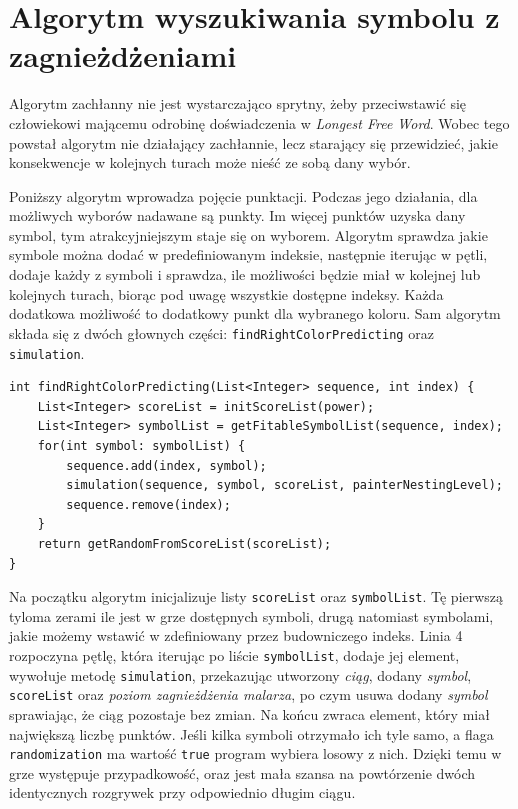 \documentclass[document]{xmgr}
\begin{document}
\section{Algorytm wyszukiwania symbolu z zagnieżdżeniami}
Algorytm zachłanny nie jest wystarczająco sprytny, żeby przeciwstawić się człowiekowi mającemu odrobinę doświadczenia w \emph{Longest Free Word}. Wobec tego powstał algorytm nie działający zachłannie, lecz starający się przewidzieć, jakie konsekwencje w kolejnych turach może nieść ze sobą dany wybór.

Poniższy algorytm wprowadza pojęcie punktacji. Podczas jego działania, dla możliwych wyborów nadawane są punkty. Im więcej punktów uzyska dany symbol, tym atrakcyjniejszym staje się on wyborem. Algorytm sprawdza jakie symbole można dodać w predefiniowanym indeksie, następnie iterując w pętli, dodaje każdy z symboli i sprawdza, ile możliwości będzie miał w kolejnej lub kolejnych turach, biorąc pod uwagę wszystkie dostępne indeksy. Każda dodatkowa możliwość to dodatkowy punkt dla wybranego koloru. Sam algorytm składa się z dwóch głownych części: \mbox{\texttt{findRightColorPredicting}} oraz \texttt{simulation}.

\begin{lstlisting}[frame=single]
int findRightColorPredicting(List<Integer> sequence, int index) {
	List<Integer> scoreList = initScoreList(power);
	List<Integer> symbolList = getFitableSymbolList(sequence, index);
	for(int symbol: symbolList) {
		sequence.add(index, symbol);
		simulation(sequence, symbol, scoreList, painterNestingLevel);
		sequence.remove(index);
	}
	return getRandomFromScoreList(scoreList);
}
\end{lstlisting}
 
Na początku algorytm inicjalizuje listy \texttt{scoreList} oraz \texttt{symbolList}. Tę pierwszą tyloma zerami ile jest w grze dostępnych symboli, drugą natomiast symbolami, jakie możemy wstawić w zdefiniowany przez budowniczego indeks. Linia 4 rozpoczyna pętlę, która iterując po liście \texttt{symbolList}, dodaje jej element, wywołuje metodę \texttt{simulation}, przekazując utworzony \emph{ciąg}, dodany \emph{symbol}, \texttt{scoreList} oraz \emph{poziom zagnieżdżenia malarza}, po czym usuwa dodany \emph{symbol} sprawiając, że ciąg pozostaje bez zmian. Na końcu zwraca element, który miał największą liczbę punktów. Jeśli kilka symboli otrzymało ich tyle samo, a flaga \texttt{randomization} ma wartość \texttt{true} program wybiera losowy z nich. Dzięki temu w grze występuje przypadkowość, oraz jest mała szansa na powtórzenie dwóch identycznych rozgrywek przy odpowiednio długim ciągu.
\end{document}
